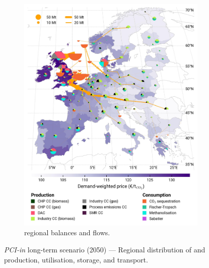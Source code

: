 \documentclass[preprint,12pt,sort&compress]{elsarticle}
\begin{document}
\begin{figure}[htbp]
\begin{subfigure}[t]{0.49\textwidth}
      \includegraphics[width=1\textwidth]{maps/pcipmi-national-international-expansion/base_s_adm___2050-balance_map_co2_stored} 
      \vspace{-0.7cm}
      \caption{ regional balances and flows.}
      \label{fig:PCI-in_lt_2050_co2}
  \end{subfigure}
  \caption{\textit{PCI-in} long-term scenario (2050) --- Regional distribution of  and  production, utilisation, storage, and transport.}
  \label{fig:PCI-in_lt_2050}
\end{figure}

\clearpage
\end{document}
